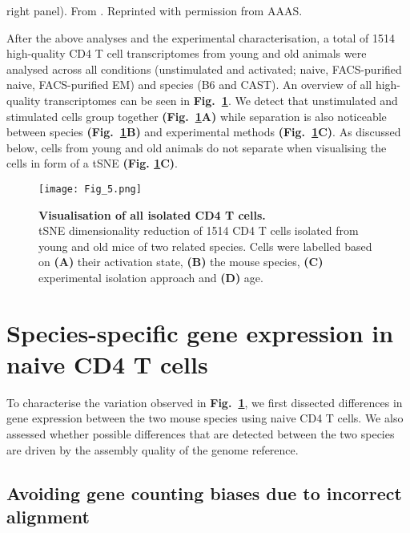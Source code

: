 {right panel). From \citep{Martinez-jimenez2017}. Reprinted with permission from AAAS.\\}
\captionsetup[figure]{list=yes}

After the above analyses and the experimental characterisation, a total of 1514 high-quality CD4\plus{} T cell transcriptomes from young and old animals were analysed across all conditions (unstimulated and activated; naive, FACS-purified naive, FACS-purified EM) and species (B6 and CAST). An overview of all high-quality transcriptomes can be seen in \textbf{Fig.~\ref{fig1:all_cells}}. We detect that unstimulated and stimulated cells group together \textbf{(Fig.~\ref{fig1:all_cells}A)} while separation is also noticeable between species \textbf{(Fig.~\ref{fig1:all_cells}B)} and experimental methods \textbf{(Fig.~\ref{fig1:all_cells}C)}. As discussed below, cells from young and old animals do not separate when visualising the cells in form of a tSNE  \textbf{(Fig. \ref{fig1:all_cells}C)}. 

\newpage

\begin{figure}[!hb]
\centering
\texttt{[image: Fig\_5.png]}
\caption[Visualisation of all isolated CD4\plus{} T cells]{\textbf{Visualisation of all isolated CD4\plus{} T cells.}\\
tSNE dimensionality reduction of 1514 CD4\plus{} T cells isolated from young and old mice of two related species. Cells were labelled based on \textbf{(A)} their activation state, \textbf{(B)} the mouse species, \textbf{(C)} experimental isolation approach and \textbf{(D)} age.}
\label{fig1:all_cells}
\end{figure}

\newpage

\section{Species-specific gene expression in naive CD4\plus{} T cells}

To characterise the variation observed in \textbf{Fig.~\ref{fig1:all_cells}}, we first dissected differences in gene expression between the two mouse species using naive CD4\plus{} T cells. We also assessed whether possible differences that are detected between the two species are driven by the assembly quality of the genome reference.

\subsection{Avoiding gene counting biases due to incorrect alignment}

